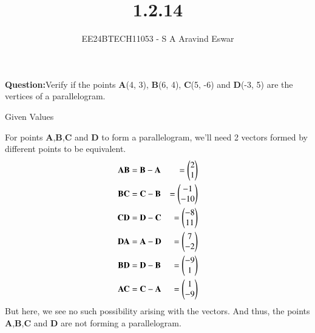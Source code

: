 \documentclass[journal]{IEEEtran}
\begin{document}

\vspace{3cm}

\title{1.2.14}
\author{EE24BTECH11053 - S A Aravind Eswar
}
{\let\newpage\relax\maketitle}

\renewcommand{\thefigure}{\theenumi}
\renewcommand{\thetable}{\theenumi}
\setlength{\intextsep}{10pt} %


\renewcommand{\thetable}{\theenumi}

\textbf{Question:}Verify if the points \textbf{A}(4, 3), \textbf{B}(6, 4), \textbf{C}(5, -6) and \textbf{D}(-3, 5) are the vertices of a
parallelogram.\\
\solution 
\begin{table}[h]
	\centering
	
	\caption{Given Values}
	\label{tab:1}
\end{table}

For points \textbf{A},\textbf{B},\textbf{C} and \textbf{D} to form a parallelogram, we'll need 2 vectors formed by different points to be equivalent.
\begin{align*}\textbf{AB} &= \textbf{B}-\textbf{A} &= \begin{pmatrix}2\\1\end{pmatrix}\\\textbf{BC} &= \textbf{C}-\textbf{B} &= \begin{pmatrix}-1\\-10\end{pmatrix}\\\textbf{CD} &=\textbf{D}-\textbf{C} &=\begin{pmatrix}-8\\11\end{pmatrix}\\\textbf{DA} &= \textbf{A}-\textbf{D} &= \begin{pmatrix}7\\-2\end{pmatrix}\\\textbf{BD} &= \textbf{D}-\textbf{B} &= \begin{pmatrix}-9\\1\end{pmatrix}\\\textbf{AC} &= \textbf{C}-\textbf{A} &= \begin{pmatrix}1\\-9\end{pmatrix}\\\end{align*}
But here, we see no such possibility arising with the vectors. And thus, the points \textbf{A},\textbf{B},\textbf{C} and \textbf{D} are not forming a parallelogram.
\end{document}

